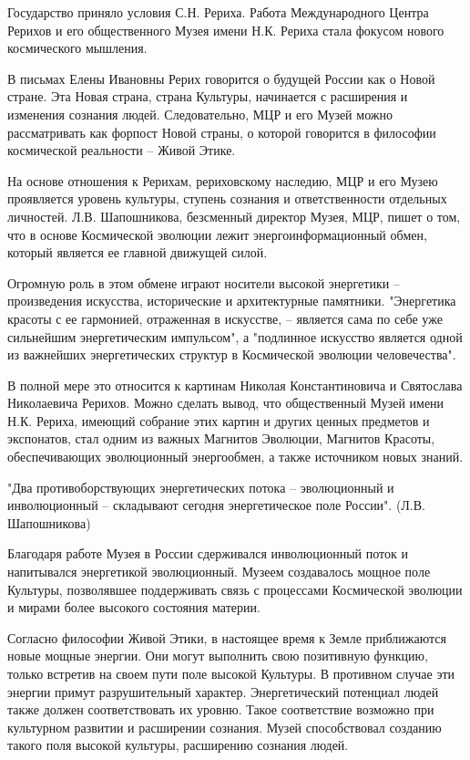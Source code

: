 \begin{itemize}
\begin{itemize}
Государство приняло условия С.Н. Рериха. Работа Международного Центра Рерихов и
его общественного Музея имени Н.К. Рериха стала фокусом нового космического
мышления.

В письмах Елены Ивановны Рерих говорится о будущей России как о Новой стране.
Эта Новая страна, страна Культуры, начинается с расширения и изменения сознания
людей. Следовательно, МЦР и его Музей можно рассматривать как форпост Новой
страны, о которой говорится в философии космической реальности – Живой Этике.

На основе отношения к Рерихам, рериховскому наследию, МЦР и его Музею
проявляется уровень культуры, ступень сознания и ответственности отдельных
личностей. Л.В. Шапошникова, безсменный директор Музея, МЦР, пишет о том, что в
основе Космической эволюции лежит энергоинформационный обмен, который является
ее главной движущей силой.

Огромную роль в этом обмене играют носители высокой энергетики – произведения
искусства, исторические и архитектурные памятники. "Энергетика красоты с ее
гармонией, отраженная в искусстве, – является сама по себе уже сильнейшим
энергетическим импульсом", а "подлинное искусство является одной из важнейших
энергетических структур в Космической эволюции человечества".

В полной мере это относится к картинам Николая Константиновича и Святослава
Николаевича Рерихов. Можно сделать вывод, что общественный Музей имени Н.К.
Рериха, имеющий собрание этих картин и других ценных предметов и экспонатов,
стал одним из важных Магнитов Эволюции, Магнитов Красоты, обеспечивающих
эволюционный энергообмен, а также источником новых знаний.

"Два противоборствующих энергетических потока – эволюционный и инволюционный –
складывают сегодня энергетическое поле России". (Л.В. Шапошникова)

Благодаря работе Музея в России сдерживался инволюционный поток и напитывался
энергетикой эволюционный. Музеем создавалось мощное поле Культуры, позволявшее
поддерживать связь с процессами Космической эволюции и мирами более высокого
состояния материи.

 

Согласно философии Живой Этики, в настоящее время к Земле приближаются новые
мощные энергии. Они могут выполнить свою позитивную функцию, только встретив на
своем пути поле высокой Культуры. В противном случае эти энергии примут
разрушительный характер. Энергетический потенциал людей также должен
соответствовать их уровню. Такое соответствие возможно при культурном развитии
и расширении сознания. Музей способствовал созданию такого поля высокой
культуры, расширению сознания людей.


\end{itemize}
\end{itemize}
